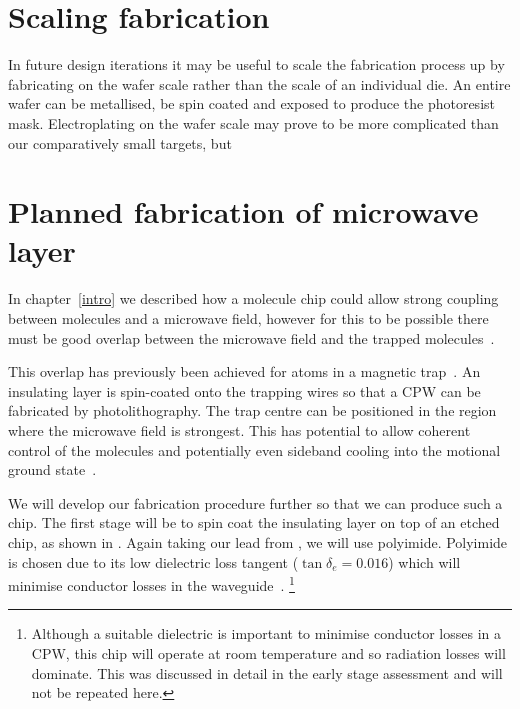 \section{Scaling fabrication}

In future design iterations it may be useful to scale the fabrication process
up by fabricating on the wafer scale rather than the scale of an individual
die. An entire wafer can be metallised, be spin coated and exposed to
produce the photoresist mask. Electroplating on the wafer scale may prove to be
more complicated than our comparatively small targets, but 

\section{Planned fabrication of microwave layer}
\label{fab:planned}

In chapter~\ref{intro} 
we described how a molecule chip could allow strong coupling between \CaF{}
molecules and a microwave field, however for this to be possible there must be
good overlap between the microwave field and the trapped
molecules~\cite{Andre2006}.
%

This overlap has previously been achieved for atoms in a magnetic
trap~\cite{Treutlein2008}. An insulating layer is spin-coated onto the trapping
wires so that a CPW  can be fabricated by
photolithography. The trap centre can be positioned in the region where the
microwave field is strongest. This has potential to allow coherent control of
the molecules and potentially even sideband cooling into the motional ground
state~\cite{Andre2006}.
%

We will develop our fabrication procedure further so that we can produce such a
chip. The first stage will be to spin coat the insulating layer on top of an
etched chip, as shown in . Again taking our lead
from , we will use polyimide. Polyimide is chosen due
to its low dielectric loss tangent ($\tan\delta_e = 0.016$) which will minimise
conductor losses in the waveguide~\cite{Collin2007, Simons2004}.
\footnote{Although a suitable dielectric is
important to minimise conductor losses in a CPW, this chip will operate at room
temperature and so radiation losses will dominate. This was discussed in detail
in the early stage assessment and will not be repeated here.}
%

